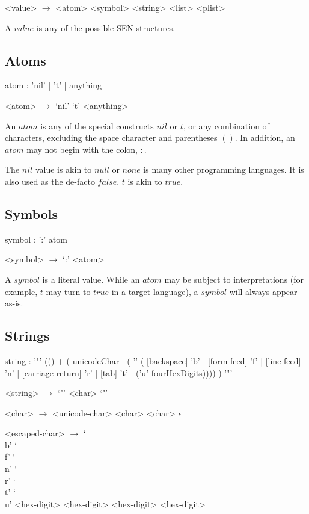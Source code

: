 \documentclass[a4paper]{article}
\begin{document}
\begin{grammar}
	<value> $\to$ <atom>
		\alt <symbol>
		\alt <string>
		\alt <plist>
\end{grammar}

A $value$ is any of the possible SEN structures.

\subsection{Atoms}
\begin{rail}
	atom : 'nil' | 't' | anything
\end{rail}

\begin{grammar}
	<atom> $\to$ `nil'
		\alt `t'
		\alt <anything>
\end{grammar}

An $atom$ is any of the special constructs $nil$ or $t$, or any combination of characters, excluding the space character and parentheses $()$. In addition, an $atom$ may not begin with the colon, $:$.

The $nil$ value is akin to $null$ or $none$ is many other programming languages. It is also used as the de-facto $false$. $t$ is akin to $true$.

\subsection{Symbols}
\begin{rail}
	symbol : ':' atom
\end{rail}

\begin{grammar}
	<symbol> $\to$ `:' <atom>
\end{grammar}

A $symbol$ is a literal value. While an $atom$ may be subject to interpretations (for example, $t$ may turn to $true$ in a target language), a $symbol$ will always appear as-is.

\subsection{Strings}
\begin{rail}
	string : '"' (() + (
		unicodeChar | (
		'' (
			[backspace] 'b' |
			[form feed] 'f' |
			[line feed] 'n' |
			[carriage return] 'r' |
			[tab] 't' |
			('u' fourHexDigits))))
	) '"'
\end{rail}

\begin{grammar}
	<string> $\to$ `"' <char> `"'

	<char> $\to$ <unicode-char> <char>
		\alt <escaped-char> <char>
		\alt $\epsilon$

	<escaped-char> $\to$ `\\b'
		\alt `\\f'
		\alt `\\n'
		\alt `\\r'
		\alt `\\t'
		\alt `\\u' <hex-digit> <hex-digit> <hex-digit> <hex-digit>
\end{grammar}
\end{document}
